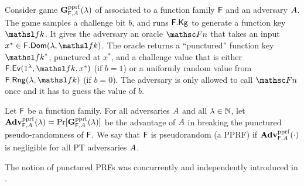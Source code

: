 Consider game $\mathbf{G}^{\rm pprf}_{\mathsf{F},A}(\lambda)$ of  associated to a function family $\FF$ and an adversary $\advA$.
The game samples a challenge bit $b$, and runs $\mathsf{F}.\mathsf{Kg}$ to generate a function key $\FKey$.
It gives the adversary an oracle $\FnO$ that takes an input $x^*\in\Dom{\FF}(\secParam,\FKey)$.
The oracle returns a ``punctured'' function key $\PFKey$, punctured at $x^*$, and a challenge value that is either $\Ev{\FF}(\secIn,\FKey,x^*)$ (if $b=1$) or a uniformly random value from $\Rng{\FF}(\secParam,\FKey)$ (if $b=0$).
The adversary is only allowed to call $\FnO$ once and it has to guess the value of $b$.
\begin{defn}
  Let $\FF$ be a function family.
  For all adversaries $\advA$ and all $\lambda\in{{\mathbb N}}$, let $\mathbf{Adv}^{\rm pprf}_{\mathsf{F},A}(\lambda)=\Pr[\mathbf{G}^{\rm pprf}_{\mathsf{F},A}(\lambda)]$ be the advantage of $\advA$ in breaking the punctured pseudo-randomness of $\FF$.
  We say that $\FF$ is pseudorandom (a PPRF) if $\mathbf{Adv}^{\rm pprf}_{\mathsf{F},A}(\cdot)$ is negligible for all PT adversaries $\advA$.
\end{defn}
The notion of punctured PRFs was concurrently and independently introduced in \cite{AC:BonWat13,CCS:KPTZ13,PKC:BoyGolIva14}.

\iffalse
\heading{Pseudorandom Function}
We present GGM's definition of pseudorandom function security~\cite{GolGolMic86}. The formalization is based on game $\gPRF{\FF}(\advA)$ of \figref{fig-ff-prf}, associated to family of functions $\FF$ and adversary $\advA$. The game initially samples a random challenge bit $b$, with $b=1$ indicating it is in ``real'' mode and $b=0$ that it is in ``random" mode. As per our conventions noted in \secref{sec-defs},  the sets $V,W$ are assumed initialized to the empty set, and the integer $v$ is assumed initialized to $0$. Now the adversary $\advA$ also has access to an evaluation oracle $\RoRO$ that takes an input $x$. The oracle either returns a uniformly random element from $\Rng{\FF}$ (for $b=0$), or an evaluation under $\Ev{\FF}$ using the key (for $b=1$). The oracle checks that $\advA$ does not an input $x$. As a last step, the adversary outputs a bit $b'$ that can be viewed as a guess for $b$.  The advantage of adversary $\advA$ in breaking the mu-ind security of   $\FF$ is defined as $\prfAdv{\FF}{\advA} = 2\Pr[\gPRF{\FF}(\advA)]- 1$.


Hmmm...PRFs also have weirdness if uniform sampling from $\Rng{\FF}$ cannot be done efficiently/if $\setsize{\Rng{\FF}}=1$ .
\fi


